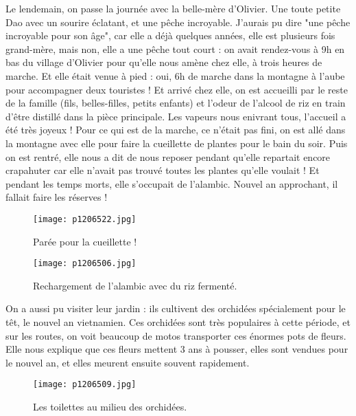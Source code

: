 \documentclass{book}
\begin{document}
Le lendemain, on passe la journée avec la belle-mère d'Olivier. Une toute petite Dao avec un sourire éclatant, et une pêche incroyable. J'aurais pu dire "une pêche incroyable pour son âge", car elle a déjà quelques années, elle est plusieurs fois grand-mère, mais non, elle a une pêche tout court : on avait rendez-vous à 9h en bas du village d'Olivier pour qu'elle nous amène chez elle, à trois heures de marche. Et elle était venue à pied : oui, 6h de marche dans la montagne à l'aube pour accompagner deux touristes ! Et arrivé chez elle, on est accueilli par le reste de la famille (fils, belles-filles, petits enfants) et l'odeur de l'alcool de riz en train d'être distillé dans la pièce principale. Les vapeurs nous enivrant tous, l'accueil a été très joyeux ! Pour ce qui est de la marche, ce n'était pas fini, on est allé dans la montagne avec elle pour faire la cueillette de plantes pour le bain du soir. Puis on est rentré, elle nous a dit de nous reposer pendant qu'elle repartait encore crapahuter car elle n'avait pas trouvé toutes les plantes qu'elle voulait ! Et pendant les temps morts, elle s'occupait de l'alambic. Nouvel an approchant, il fallait faire les réserves !


\begin{figure}[h]
\centering
\texttt{[image: p1206522.jpg]}
\caption*{Parée pour la cueillette !}
\end{figure}


\begin{figure}[h]
\centering
\texttt{[image: p1206506.jpg]}
\caption*{Rechargement de l'alambic avec du riz fermenté.}
\end{figure}

On a aussi pu visiter leur jardin : ils cultivent des orchidées spécialement pour le têt, le nouvel an vietnamien. Ces orchidées sont très populaires à cette période, et sur les routes, on voit beaucoup de motos transporter ces énormes pots de fleurs. Elle nous explique que ces fleurs mettent 3 ans à pousser, elles sont vendues pour le nouvel an, et elles meurent ensuite souvent rapidement.


\begin{figure}[h]
\centering
\texttt{[image: p1206509.jpg]}
\caption*{Les toilettes au milieu des orchidées.}
\end{figure}
\end{document}
